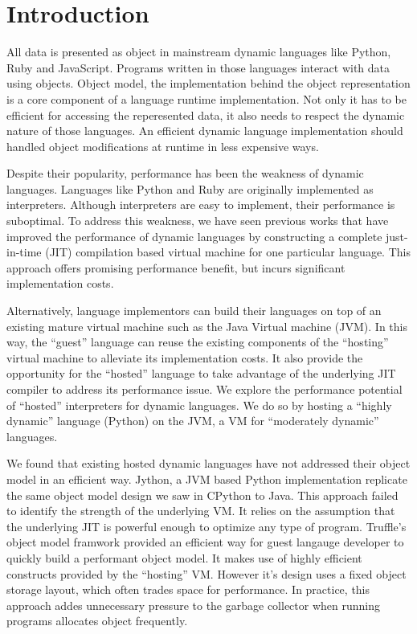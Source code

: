 \section{Introduction}

All data is presented as object in mainstream dynamic languages like Python, Ruby and JavaScript.
Programs written in those languages interact with data using objects.
Object model, the implementation behind the object representation is a core component of a language runtime implementation.
Not only it has to be efficient for accessing the reperesented data, it also needs to respect the dynamic nature of those languages.
An efficient dynamic language implementation should handled object modifications at runtime in less expensive ways.

Despite their popularity, performance has been the weakness of dynamic languages.
Languages like Python and Ruby are originally implemented as interpreters.
Although interpreters are easy to implement, their performance is suboptimal.
To address this weakness, we have seen previous works that have improved the performance of dynamic languages
by constructing a complete just-in-time (JIT) compilation based virtual machine for one particular language.
This approach offers promising performance benefit, but incurs significant implementation costs.

Alternatively, language implementors can build their languages on top of an existing mature virtual machine such as the Java Virtual machine (JVM).
In this way, the ``guest'' language can reuse the existing components of the ``hosting'' virtual machine to alleviate its implementation costs.
It also provide the opportunity for the ``hosted'' language to take advantage of the underlying JIT compiler to address its performance issue.
We explore the performance potential of ``hosted'' interpreters for dynamic languages.
We do so by hosting a ``highly dynamic'' language (Python) on the JVM, a VM for ``moderately dynamic'' languages.

We found that existing hosted dynamic languages have not addressed their object model in an efficient way.
Jython, a JVM based Python implementation replicate the same object model design we saw in CPython to Java.
This approach failed to identify the strength of the underlying VM.
It relies on the assumption that the underlying JIT is powerful enough to optimize any type of program.
Truffle's object model framwork provided an efficient way for guest langauge developer to quickly build a performant object model.
It makes use of highly efficient constructs provided by the ``hosting'' VM.
However it's design uses a fixed object storage layout, which often trades space for performance.
In practice, this approach addes unnecessary pressure to the garbage collector when running programs allocates object frequently.

